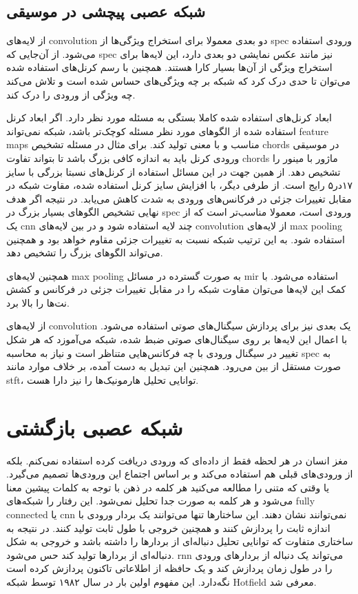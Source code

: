 \subsection{شبکه عصبی پیچشی در موسیقی}
از لایه‌های \gls{convolution} دو بعدی معمولا برای استخراج ویژگی‌ها از \gls{spec}
ورودی استفاده می‌شود. از آن‌جایی که \gls{spec} نیز مانند عکس نمایشی دو بعدی
دارد، این لایه‌ها برای استخراج ویژگی از آن‌ها بسیار کارا هستند. همچنین با رسم
کرنل‌های استفاده شده می‌توان تا حدی درک کرد که شبکه بر چه ویژگی‌های حساس شده است
و تلاش می‌کند چه ویژگی از ورودی را درک کند.

ابعاد کرنل‌های استفاده شده کاملا بستگی به مسئله مورد نظر دارد. اگر ابعاد کرنل
استفاده شده از الگوهای مورد نظر مسئله کوچک‌تر باشد، شبکه نمی‌تواند
\glspl{feature map} مناسب و با معنی تولید کند. برای مثال در مسئله تشخیص
\glspl{chord} در موسیقی ورودی کرنل باید به اندازه کافی بزرگ باشد تا بتواند تفاوت
\glspl{chord} ماژور با مینور را تشخیص دهد. از همین جهت در این مسائل استفاده از
کرنل‌های نسبتا بزرگی با سایز ۱۷در۵ رایج است. از طرفی دیگر، با افزایش سایز کرنل
استفاده شده، مقاوت شبکه در مقابل تغییرات جزئی در فرکانس‌های ورودی به شدت کاهش
می‌یابد. در نتیجه اگر هدف نهایی تشخیص الگوهای بسیار بزرگ در \gls{spec} ورودی
است، معمولا مناسب‌تر است که از یک \gls{cnn} چند لایه استفاده شود و در بین
لایه‌های \gls{convolution} از لایه‌های \gls{max pooling} استفاده شود. به این
ترتیب شبکه نسبت به تغییرات جزئی مقاوم خواهد بود و همچنین می‌تواند الگوهای بزرگ
را تشخیص دهد.

همچنین لایه‌های \gls{max pooling} به صورت گسترده در مسائل \gls{mir} استفاده
می‌شود. با کمک این لایه‌ها می‌توان مقاوت شبکه را در مقابل تغییرات جزئی در فرکانس
و کشش نت‌ها را بالا برد.

از لایه‌های \gls{convolution} یک بعدی نیز برای پردازش سیگنال‌های صوتی استفاده
می‌شود. با اعمال این لایه‌ها بر روی سیگنال‌های صوتی ضبط شده، شبکه می‌‌آموزد که
هر شکل تغییر در سیگنال ورودی با چه فرکانس‌هایی متناظر است و نیاز به محاسبه
\gls{spec} به صورت مستقل از بین می‌رود. همچنین این تبدیل به دست آمده، بر خلاف
موارد مانند \gls{stft}، توانایی تحلیل هارمونیک‌ها را نیز دارا هست.

\section{شبکه عصبی بازگشتی}
مغز انسان در هر لحظه فقط از داده‌ای که ورودی دریافت کرده استفاده نمی‌کنم. بلکه
از ورودی‌های قبلی هم استفاده می‌کند و بر اساس اجتماع این ورودی‌ها تصمیم می‌گیرد.
یا وقتی که متنی را مطالعه می‌کنید هر کلمه در ذهن با توجه به کلمات پیشین معنا
می‌شود و هر کلمه به صورت جدا تحلیل نمی‌شود. این رفتار را شبکه‌های \gls{fully
connected} یا \gls{cnn} نمی‌توانند نشان دهند. این ساختارها تنها می‌توانند یک
بردار ورودی با اندازه ثابت را پردازش کنند و همچنین خروجی با طول ثابت تولید کنند.
در نتیجه به ساختاری متفاوت که توانایی تحلیل دنباله‌ای از بردارها را داشته باشد و
خروجی به شکل دنباله‌ای از بردارها تولید کند حس می‌شود. \gls{rnn} می‌تواند یک
دنباله از بردارهای ورودی را در طول زمان پردازش کند و یک حافظه از اطلاعاتی تاکنون
پردازش کرده است نگه‌دارد. این مفهوم اولین بار در سال ۱۹۸۲ توسط شبکه Hotfield
معرفی شد.


